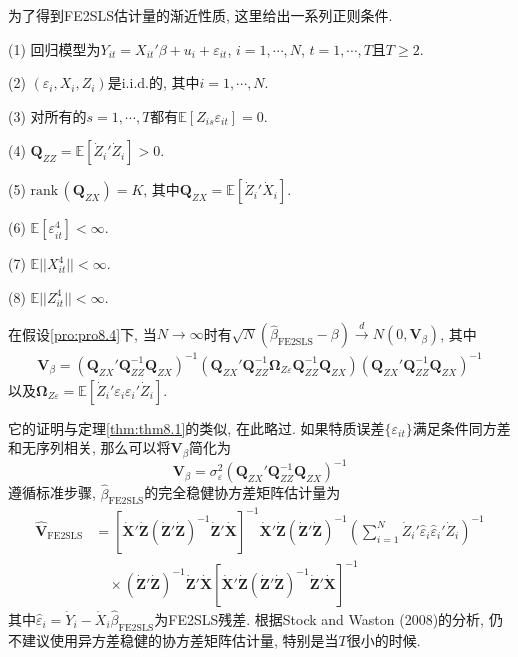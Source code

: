\documentclass[cn, 12pt, math=mtpro2, bibstyle=apa, blue, twocol]{elegantbook}
\newcommand{\E}{\mathbb{E}}
\newcommand{\Q}{\mathbold{Q}}
\newcommand{\X}{\mathbold{X}}
\newcommand{\Z}{\mathbold{Z}}
\newcommand{\hb}{\hat{\beta}}
\newcommand{\V}{\mathbold{V}}
\newcommand{\BO}{\mathbold{\Omega}}
\begin{document}
为了得到FE2SLS估计量的渐近性质, 这里给出一系列正则条件.
\begin{proposition}\label{pro:pro8.4}
(1) 回归模型为$Y_{it}=X_{it}'\beta+u_i+\varepsilon_{it}$, $i=1,\cdots,N$, $t=1,\cdots,T$且$T\geq2$.

(2) $(\varepsilon_i, X_i, Z_i)$是i.i.d.的, 其中$i=1,\cdots,N$.

(3) 对所有的$s=1,\cdots,T$都有$\E[Z_{is}\varepsilon_{it}]=0$.

(4) $\Q_{ZZ}=\E[\dot{Z}_i'\dot{Z}_i]>0$.

(5) $\text{rank}\,(\Q_{ZX})=K$, 其中$\Q_{ZX}=\E[\dot{Z}_i'\dot{X}_i]$.

(6) $\E[\varepsilon_{it}^4]<\infty$.

(7) $\E||X_{it}^4||<\infty$.

(8) $\E||Z_{it}^4||<\infty$.
\end{proposition}
\begin{theorem}
  在假设\ref{pro:pro8.4}下, 当$N\to\infty$时有$\sqrt{N}(\hb_\text{FE2SLS}-\beta)\xrightarrow{d} N(0,\V_\beta)$, 其中
  \begin{align*}
  \V_\beta=(\Q_{ZX}'\Q_{ZZ}^{-1}\Q_{ZX})^{-1}(\Q_{ZX}'\Q_{ZZ}^{-1}\BO_{Z\varepsilon}\Q_{ZZ}^{-1}\Q_{ZX})(\Q_{ZX}'\Q_{ZZ}^{-1}\Q_{ZX})^{-1}
  \end{align*}
  以及$\BO_{Z\varepsilon}=\E[\dot{Z}_i'\varepsilon_i\varepsilon_i'\dot{Z}_i]$.
\end{theorem}
它的证明与定理\ref{thm:thm8.1}的类似, 在此略过. 如果特质误差$\{\varepsilon_{it}\}$满足条件同方差和无序列相关, 那么可以将$\V_\beta$简化为
$$\V_\beta=\sigma_\varepsilon^2(\Q_{ZX}'\Q_{ZZ}^{-1}\Q_{ZX})^{-1}$$
遵循标准步骤, $\hb_{\text{FE2SLS}}$的完全稳健协方差矩阵估计量为
\begin{align*}
\hat{\V}_\text{FE2SLS}&=[\dot{\X}'\dot{\Z}(\dot{\Z}'\dot{\Z})^{-1}\dot{\Z}'\dot{\X}]^{-1}\dot{\X}'\dot{\Z}(\dot{\Z}'\dot{\Z})^{-1}\left(\sum_{i=1}^{N}\dot{Z}_i'\hat{\varepsilon}_i\hat{\varepsilon}_i'\dot{Z}_i\right)^{-1} \\
&\quad\times (\dot{\Z}'\dot{\Z})^{-1}\dot{\Z}'\dot{\X}[\dot{\X}'\dot{\Z}(\dot{\Z}'\dot{\Z})^{-1}\dot{\Z}'\dot{\X}]^{-1}
\end{align*}
其中$\hat{\varepsilon}_i=\dot{Y}_i-\dot{X}_i\hb_\text{FE2SLS}$为FE2SLS残差. 根据Stock and Waston (2008)的分析, 仍不建议使用异方差稳健的协方差矩阵估计量, 特别是当$T$很小的时候.
\end{document}
